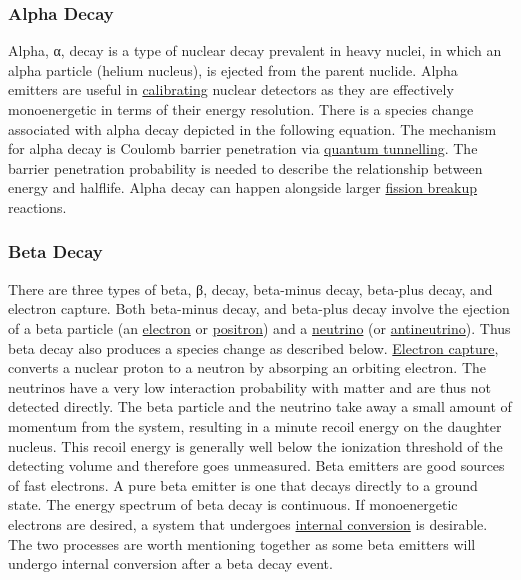 \documentclass[12pt]{article}
\begin{document}
\begin{doublespacing}
\subsubsection{Alpha Decay}
Alpha, α, decay is a type of nuclear decay prevalent in heavy nuclei, in which an alpha particle (helium nucleus), is ejected from the parent nuclide. Alpha emitters are useful in \href{http://cs.smu.ca/~andrew/files/ugthesis/SMU-Thesis-v.1.0.1.pdf}{calibrating} nuclear detectors as they are effectively monoenergetic in terms of their energy resolution. There is a species change associated with alpha decay depicted in the following equation.
The mechanism for alpha decay is Coulomb barrier penetration via \href{https://en.wikipedia.org/wiki/Quantum_tunneling}{quantum tunnelling}. The barrier penetration probability is needed to describe the relationship between energy and halflife. Alpha decay can happen alongside larger \href{https://en.wikipedia.org/wiki/Nuclear_fission}{fission breakup} reactions.

\subsubsection{Beta Decay}
There are three types of beta, β, decay, beta-minus decay, beta-plus decay, and electron capture. Both beta-minus decay, and beta-plus decay involve the ejection of a beta particle (an \href{http://en.wikipedia.org/wiki/Electron}{electron} or \href{http://en.wikipedia.org/wiki/Positron}{positron}) and a \href{http://en.wikipedia.org/wiki/Neutrino}{neutrino} (or \href{http://en.wikipedia.org/wiki/Antineutrino#Antineutrinos}{antineutrino}). Thus beta decay also produces a species change as described below. \href{https://en.wikipedia.org/wiki/Electron_capture}{Electron capture}, converts a nuclear proton to a neutron by absorping an orbiting electron.
The neutrinos have a very low interaction probability with matter and are thus not detected directly. The beta particle and the neutrino take away a small amount of momentum from the system, resulting in a minute recoil energy on the daughter nucleus. This recoil energy is generally well below the ionization threshold of the detecting volume and therefore goes unmeasured.
Beta emitters are good sources of fast electrons. A pure beta emitter is one that decays directly to a ground state. The energy spectrum of beta decay is continuous. If monoenergetic electrons are desired, a system that undergoes \href{https://en.wikipedia.org/wiki/Internal_conversion}{internal conversion} is desirable. The two processes are worth mentioning together as some beta emitters will undergo internal conversion after a beta decay event.


\end{doublespacing}
\end{document}

